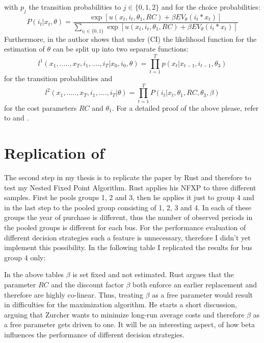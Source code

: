 \documentclass[a4paper,12pt,bold]{scrartcl}
\begin{document}
with \(p_j\) the transition probabilities to \(j \in \{0,1,2\}\) and for the choice probabilities:
\begin{equation}
P(i_t | x_t, \theta) = \frac{\exp[u(x_t, i_t, \theta_1, RC) + \beta EV_{\theta} (i_t * x_t)]}{ \sum_{i_t \in \{0, 1\}}\exp[u(x_t, i_t, \theta_1, RC) + \beta EV_{\theta} (i_t * x_t)]}
\end{equation}
Furthermore, in \cite{Rust.1988} the author shows that under (CI) the likelihood function for the estimation of \(\theta\) can be split up into two separate functions:
\begin{equation}
  l^1(x_1, .....,  x_T, i_1, ...., i_T | x_0, i_0, \theta) = \prod_{t = 1}^T p(x_t | x_{t-1}, i_{t-1}, \theta_3)
\end{equation}
for the transition probabilities and
\begin{equation}
  l^2(x_1, .....,  x_T, i_1, ...., i_T | \theta) = \prod_{t = 1}^T P(i_t | x_t, \theta_1, RC, \theta_3, \beta)
\end{equation}
for the cost parameters $RC$ and \(\theta_1\). For a detailed proof of the above please, refer to \cite{Rust.1987} and \cite{Rust.1988}.

\section{Replication of \cite{Rust.1987}}
The second step in my thesis is to replicate the paper by Rust and therefore to test my Nested Fixed Point Algorithm. Rust applies his NFXP to three different samples. First he pools groups 1, 2 and 3, then he applies it just to group 4 and in the last step to the pooled group consisting of 1, 2, 3 and 4. In each of these groups the year of purchase is different, thus the number of observed periods in the pooled groups is different for each bus. For the performance evaluation of different decision strategies such a feature is unnecessary, therefore I didn't yet implement this possibility. In the following table I replicated the results for bus group 4 only:
\begin{table}[h]
\begin{center}
  
\end{center}
\end{table}

In the above tables $\beta$ is set fixed and not estimated. Rust argues that the parameter $RC$ and the discount factor $\beta$ both enforce an earlier replacement and therefore are highly co-linear. Thus, treating $\beta$ as a free parameter would result in difficulties for the maximization algorithm. He starts a short discussion, arguing that Zurcher wants to minimize long-run average costs and therefore $\beta$ as a free parameter gets driven to one. It will be an interesting aspect, of how beta influences the performance of different decision strategies.
\end{document}
